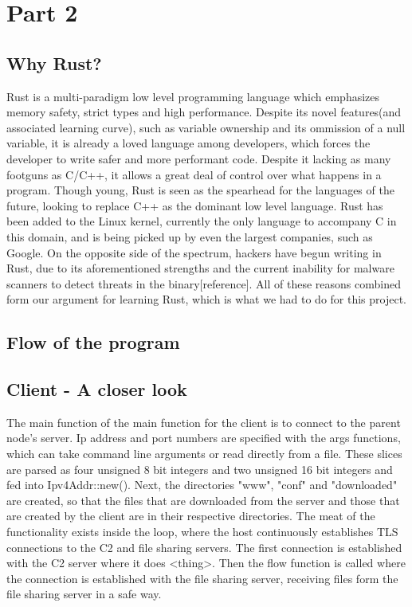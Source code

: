 \documentclass[../main.tex]{subfiles}
\begin{document}
	\chapter{Part 2}


	\section{Why Rust?}


Rust is a multi-paradigm low level programming language which emphasizes memory safety, strict types and high performance. Despite its novel features(and associated learning curve),
such as variable ownership and its ommission of a null variable, it is already a loved language among developers, which forces the developer to write safer and more performant code.
Despite it lacking as many footguns as C/C++, it allows a great deal of control over what happens in a program. Though young, Rust is seen as the spearhead for the languages of the 
future, looking to replace C++ as the dominant low level language. Rust has been added to the Linux kernel, currently the only language to accompany C in this domain, and is being 
picked up by even the largest companies, such as Google. On the opposite side of the spectrum, hackers have begun writing in Rust, due to its aforementioned strengths and the 
current inability for malware scanners to detect threats in the binary[reference]. All of these reasons combined form our argument for learning Rust, which is what we had to do for
this project.

	\vspace{10pt}

	\section{Flow of the program}

	\section{Client - A closer look}


The main function of the main function for the client is to connect to the parent node's server. Ip address and port numbers are specified with the args functions, which can take
command line arguments or read directly from a file. These slices are parsed as four unsigned 8 bit integers and two unsigned 16 bit integers and fed into Ipv4Addr::new().
Next, the directories "www", "conf" and "downloaded" are created, so that the files that are downloaded from the server and those that are created by the client are in their respective
directories. The meat of the functionality exists inside the loop, where the host continuously establishes TLS connections to the C2 and file sharing servers. The first connection is 
established with the C2 server where it does <thing>. Then the flow function is called where the connection is established with the file sharing server, receiving files form the file
sharing server in a safe way.
	\vspace{10pt}
\end{document}
